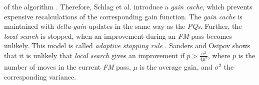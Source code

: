 of the algorithm \cite{papa2007hypergraph}. Therefore, Schlag et al. \cite{akhremtsev2017engineering,
schlag2016k} introduce a \emph{gain cache}, which prevents
expensive recalculations of the corresponding gain function. The \emph{gain cache} is maintained
with \emph{delta-gain} updates in the same way as the \emph{PQs}. Further, the \emph{local search}
is stopped, when an improvement during an \emph{FM} pass becomes unlikely. This model is
called \emph{adaptive stopping rule} \cite{akhremtsev2017engineering}. Sanders and
Osipov \cite{osipov2010n} shows that it is unlikely that \emph{local search} gives an improvement if
$p > \frac{\sigma^2}{4\mu^2}$, where $p$ is the number of moves in the current \emph{FM} pass,
$\mu$ is the average gain, and $\sigma^2$ the corresponding variance.